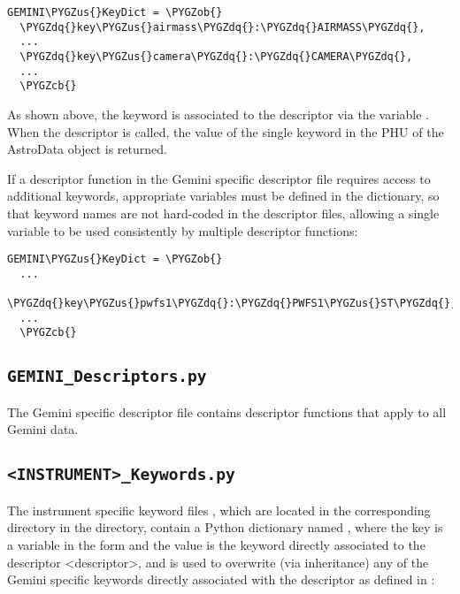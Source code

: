 \documentclass[letterpaper,10pt,english]{sphinxmanual}
\def\PYGZus{\char`\_}
\def\PYGZob{\char`\{}
\def\PYGZcb{\char`\}}
\def\PYGZdq{\char`\"}
\begin{document}
\begin{Verbatim}[commandchars=\\\{\}]
GEMINI\PYGZus{}KeyDict = \PYGZob{}
  \PYGZdq{}key\PYGZus{}airmass\PYGZdq{}:\PYGZdq{}AIRMASS\PYGZdq{},
  ...
  \PYGZdq{}key\PYGZus{}camera\PYGZdq{}:\PYGZdq{}CAMERA\PYGZdq{},
  ...
  \PYGZcb{}
\end{Verbatim}

As shown above, the  keyword is associated to the 
descriptor via the variable . When the  descriptor is
called, the value of the single keyword  in the PHU of the AstroData
object is returned.

If a descriptor function in the Gemini specific descriptor file
 requires access to additional keywords, appropriate
variables must be defined in the  dictionary, so that keyword
names are not hard-coded in the descriptor files, allowing a single variable
to be used consistently by multiple descriptor functions:

\begin{Verbatim}[commandchars=\\\{\}]
GEMINI\PYGZus{}KeyDict = \PYGZob{}
  ...
  \PYGZdq{}key\PYGZus{}pwfs1\PYGZdq{}:\PYGZdq{}PWFS1\PYGZus{}ST\PYGZdq{},
  ...
  \PYGZcb{}
\end{Verbatim}


\subsection{\texttt{GEMINI\_Descriptors.py}}
\label{coding:gemini-descriptors-py}
The Gemini specific descriptor file  contains
descriptor functions that apply to all Gemini data.


\subsection{\texttt{\textless{}INSTRUMENT\textgreater{}\_Keywords.py}}
\label{coding:instrument-keywords-py}
The instrument specific keyword files , which are
located in the corresponding  directory in the
 directory, contain a Python
dictionary named , where the key is a variable in the
form  and the value is the keyword directly associated to
the descriptor \textless{}descriptor\textgreater{}, and is used to overwrite (via inheritance) any of
the Gemini specific keywords directly associated with the descriptor as defined
in :
\end{document}
